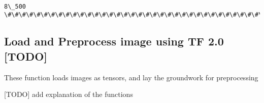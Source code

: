 \documentclass[11pt]{article}
\begin{document}
    \begin{center}
    \end{center}
    { \hspace*{\fill} \\}
    
    \begin{Verbatim}[commandchars=\\\{\}]
8\_500
\#\#\#\#\#\#\#\#\#\#\#\#\#\#\#\#\#\#\#\#\#\#\#\#\#\#\#\#\#\#\#\#\#\#\#\#\#\#\#\#\#\#
\end{Verbatim}

    \subsection{Load and Preprocess image using TF 2.0
{[}TODO{]}}\label{load-and-preprocess-image-using-tf-2.0-todo}

These function loads images as tensors, and lay the groundwork for
preprocessing

    {[}TODO{]} add explanation of the functions
\end{document}
